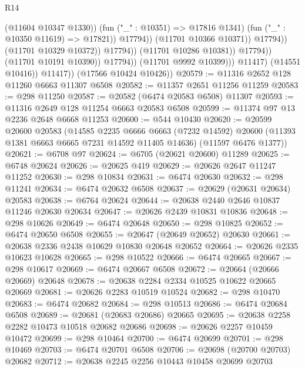 \begin{lexlean}{R14}
\begin{coremodule}
{{{{{{{{{{{{{{{{{{{{{{{{{{{{{{{{{{{{{{{{{{{{{{{{{{{{{{{{{{{{{{{{{{{{{{{{{{{{{{{{{{                                                  (@11604 @10347 @1330))
                                                (fun ("_" : @10351) => @17816 @1341)
                                                (fun ("_" : @10350 @11619) => @17821))
                                              @17794))
                                          (@11701 @10366 @10371))
                                        @17794))
                                    (@11701 @10329 @10372))
                                  @17794))
                              (@11701 @10286 @10381))
                            @17794))
                        (@11701 @10191 @10390))
                      @17794))
                  (@11701 @9992 @10399)))
              @11417)
            (@14551 @10416))
          @11417))
      (@17566 @10424 @10426))
@20579 := @11316 @2652 @128 @11260 @6663 @11307 @6508
@20582 := @11357 @2651 @11256 @11259
@20583 := @298 @11250
@20587 := @20582 (@6474 @20583 @6508) @11307
@20593 := @11316 @2649 @128 @11254 @6663 @20583 @6508
@20599 := @11374 @97 @13 @2236 @2648 @6668 @11253
@20600 := @544 @10430
@20620 := @20599
    @20600
    @20583
    (@14585
      @2235
      @6666
      @6663
      (@7232 @14592)
      @20600
      (@11393 @1381 @6663 @6665 @7231 @14592 @11405 @14636)
      (@11597 @6476 @1377))
@20621 := @6708 @97
@20624 := @6705 (@20621 @20600) @11289
@20625 := @6748 @20624
@20626 := @20625 @419
@20629 := @20626 @2647 @11247 @11252
@20630 := @298 @10834
@20631 := @6474 @20630
@20632 := @298 @11241
@20634 := @6474 @20632 @6508
@20637 := @20629 (@20631 @20634) @20583
@20638 := @6764 @20624
@20644 := @20638 @2440 @2646 @10837 @11246 @20630 @20634
@20647 := @20626 @2439 @10831 @10836
@20648 := @298 @10626
@20649 := @6474 @20648
@20650 := @298 @10825
@20652 := @6474 @20650 @6508
@20655 := @20647 (@20649 @20652) @20630
@20661 := @20638 @2336 @2438 @10629 @10830 @20648 @20652
@20664 := @20626 @2335 @10623 @10628
@20665 := @298 @10522
@20666 := @6474 @20665
@20667 := @298 @10617
@20669 := @6474 @20667 @6508
@20672 := @20664 (@20666 @20669) @20648
@20678 := @20638 @2284 @2334 @10525 @10622 @20665 @20669
@20681 := @20626 @2283 @10519 @10524
@20682 := @298 @10470
@20683 := @6474 @20682
@20684 := @298 @10513
@20686 := @6474 @20684 @6508
@20689 := @20681 (@20683 @20686) @20665
@20695 := @20638 @2258 @2282 @10473 @10518 @20682 @20686
@20698 := @20626 @2257 @10459 @10472
@20699 := @298 @10464
@20700 := @6474 @20699
@20701 := @298 @10469
@20703 := @6474 @20701 @6508
@20706 := @20698 (@20700 @20703) @20682
@20712 := @20638 @2245 @2256 @10443 @10458 @20699 @20703
}}}}}}}}}}}}}}}}}}}}}}}}}}}}}}}}}}}}}}}}}}}}}}}}}}}}}}}}}}}}}}}}}}}}}}}}}}}}}}}}}}
\end{coremodule}
\end{lexlean}
